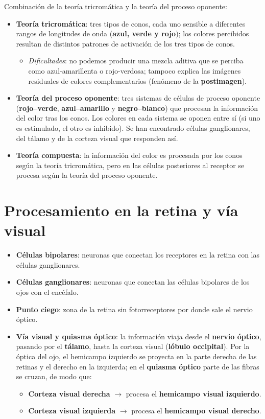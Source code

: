 \documentclass[11pt,a4paper]{article}
\begin{document}
Combinación de la teoría tricromática y la teoría del proceso oponente:

\begin{itemize}
  \item \textbf{Teoría tricromática}: tres tipos de conos, cada uno sensible a diferentes rangos de longitudes de onda (\textbf{azul, verde y rojo}); los colores percibidos resultan de distintos patrones de activación de los tres tipos de conos.
  \begin{itemize}
    \item \emph{Dificultades}: no podemos producir una mezcla aditiva que se perciba como azul-amarillenta o rojo-verdosa; tampoco explica las imágenes residuales de colores complementarios (fenómeno de la \textbf{postimagen}).
  \end{itemize}
  \item \textbf{Teoría del proceso oponente}: tres sistemas de células de proceso oponente (\textbf{rojo--verde}, \textbf{azul--amarillo} y \textbf{negro--blanco}) que procesan la información del color tras los conos. Los colores en cada sistema se oponen entre sí (si uno es estimulado, el otro es inhibido). Se han encontrado células ganglionares, del tálamo y de la corteza visual que responden así.
  \item \textbf{Teoría compuesta}: la información del color es procesada por los conos según la teoría tricromática, pero en las células posteriores al receptor se procesa según la teoría del proceso oponente.
\end{itemize}

\section{Procesamiento en la retina y vía visual}

\begin{itemize}
  \item \textbf{Células bipolares}: neuronas que conectan los receptores en la retina con las células ganglionares.
  \item \textbf{Células ganglionares}: neuronas que conectan las células bipolares de los ojos con el encéfalo.
  \item \textbf{Punto ciego}: zona de la retina sin fotorreceptores por donde sale el nervio óptico.
  \item \textbf{Vía visual y quiasma óptico}: la información viaja desde el \textbf{nervio óptico}, pasando por el \textbf{tálamo}, hasta la corteza visual (\textbf{lóbulo occipital}). Por la óptica del ojo, el hemicampo izquierdo se proyecta en la parte derecha de las retinas y el derecho en la izquierda; en el \textbf{quiasma óptico} parte de las fibras se cruzan, de modo que:
  \begin{itemize}
    \item \textbf{Corteza visual derecha} $\rightarrow$ procesa el \textbf{hemicampo visual izquierdo}.
    \item \textbf{Corteza visual izquierda} $\rightarrow$ procesa el \textbf{hemicampo visual derecho}.
  \end{itemize}
\end{itemize}
\end{document}
